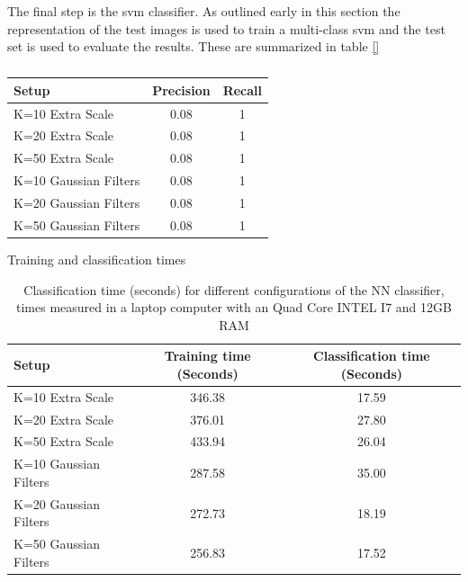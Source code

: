 \documentclass[10pt,twocolumn,letterpaper]{article}
\begin{document}
The final step is the svm classifier. As outlined early in this section the representation of the test images is used to train a multi-class svm and the test set is used to evaluate the results. These are summarized in table \ref{}

\begin{table}[t]
\centering
\begin{tabular}{ l | c | c  }
Setup & Precision & Recall    \\
\hline	
K=10 Extra Scale & 0.08 & 1  \\
K=20 Extra Scale & 0.08 & 1  \\
K=50 Extra Scale & 0.08 & 1  \\
K=10 Gaussian Filters & 0.08 & 1 \\
K=20 Gaussian Filters & 0.08 & 1 \\
K=50 Gaussian Filters & 0.08 & 1  \\

\end{tabular}
\caption{}
\label{table:extraPR}
\end{table}


Training and classification times


\begin{table}[t]
\centering
\begin{tabular}{ l | c | c  }
Setup & Training time (Seconds) & Classification time (Seconds)    \\
\hline	
K=10 Extra Scale & 346.38 & 17.59 \\
K=20 Extra Scale & 376.01 & 27.80 \\
K=50 Extra Scale & 433.94 &  26.04\\
K=10 Gaussian Filters & 287.58 & 35.00 \\
K=20 Gaussian Filters & 272.73 & 18.19 \\
K=50 Gaussian Filters & 256.83 & 17.52 \\


\end{tabular}
\caption{Classification time (seconds) for different configurations of the NN classifier, times measured in a laptop computer with an Quad Core INTEL I7 and 12GB RAM}
\label{table:timesNN}
\end{table}


{\small


}
\end{document}
